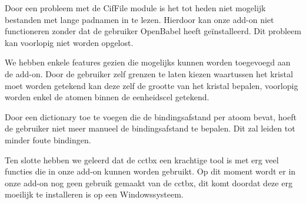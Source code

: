 Door een probleem met de CifFile module is het tot heden niet mogelijk bestanden met lange padnamen in te lezen. Hierdoor kan onze add-on niet functioneren zonder dat de gebruiker OpenBabel heeft geïnstalleerd. Dit probleem kan voorlopig niet worden opgelost. 
\par
We hebben enkele features gezien die mogelijks kunnen worden toegevoegd aan de add-on. Door de gebruiker zelf grenzen te laten kiezen waartussen het kristal moet worden getekend kan deze zelf de grootte van het kristal bepalen, voorlopig worden enkel de atomen binnen de eenheidscel getekend.
\par
Door een dictionary toe te voegen die de bindingsafstand per atoom bevat, hoeft de gebruiker niet meer manueel de bindingsafstand te bepalen. Dit zal leiden tot minder foute bindingen.
\par
Ten slotte hebben we geleerd dat de cctbx een krachtige tool is met erg veel functies die in onze add-on kunnen worden gebruikt. Op dit moment wordt er in onze add-on nog geen gebruik gemaakt van de cctbx, dit komt doordat deze erg moeilijk te installeren is op een Windowssysteem.  


 
   
